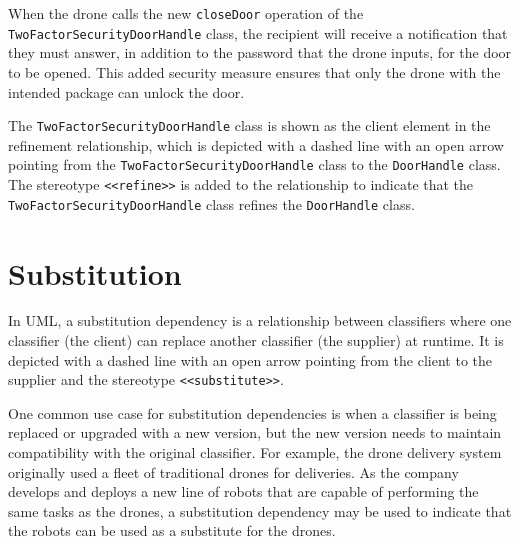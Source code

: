 \documentclass[
	12pt,
    a4paper,
    egregdoesnotlikesansseriftitles, %
    toc=chapterentrywithdots,
    oneside, openany,
    titlepage,
    parskip=half,
    headings=normal,  %
    listof=totoc,
    bibliography=totocnumbered,
    index=totoc,
    captions=tableheading,  %
    listof=flat,
    numbers=noenddot, %
    final]
    {scrbook}
\begin{document}
When the drone calls the new \texttt{closeDoor} operation of the \texttt{TwoFactorSecurityDoorHandle} class, the recipient will receive a notification that they must answer, in addition to the password that the drone inputs, for the door to be opened. This added security measure ensures that only the drone with the intended package can unlock the door.

The \texttt{TwoFactorSecurityDoorHandle} class is shown as the client element in the refinement relationship, which is depicted with a dashed line with an open arrow pointing from the \texttt{TwoFactorSecurityDoorHandle} class to the \texttt{DoorHandle} class. The stereotype \texttt{<<refine>>} is added to the relationship to indicate that the \texttt{TwoFactorSecurityDoorHandle} class refines the \texttt{DoorHandle} class.

\section{Substitution}

In UML, a substitution dependency is a relationship between classifiers where one classifier (the client) can replace another classifier (the supplier) at runtime. 
It is depicted with a dashed line with an open arrow pointing from the client to the supplier and the stereotype \texttt{<<substitute>>}. \cite[p.165]{uml}


One common use case for substitution dependencies is when a classifier is being replaced or upgraded with a new version, but the new version needs to maintain compatibility with the original classifier. 
For example, the drone delivery system originally used a fleet of traditional drones for deliveries. As the company develops and deploys a new line of robots that are capable of performing the same tasks as the drones, a substitution dependency may be used to indicate that the robots can be used as a substitute for the drones.
\end{document}
